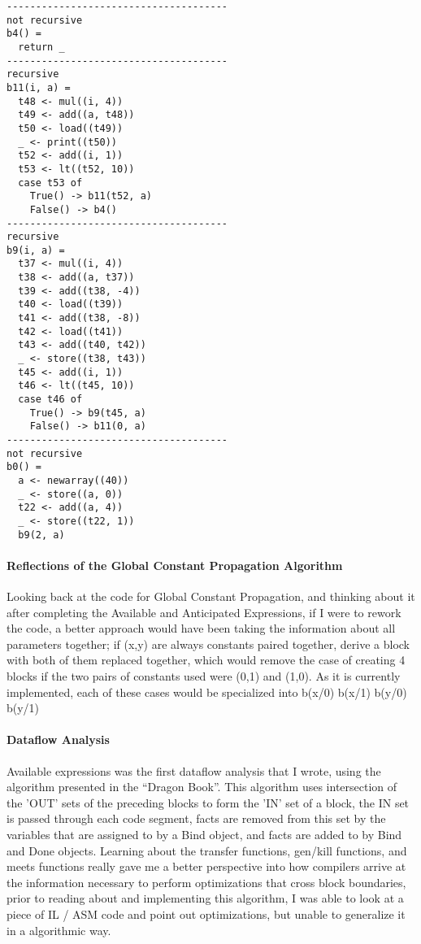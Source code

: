 \documentclass[14pt]{article}
\begin{document}
\begin{verbatim}
--------------------------------------
not recursive
b4() =
  return _
--------------------------------------
recursive
b11(i, a) =
  t48 <- mul((i, 4))
  t49 <- add((a, t48))
  t50 <- load((t49))
  _ <- print((t50))
  t52 <- add((i, 1))
  t53 <- lt((t52, 10))
  case t53 of
    True() -> b11(t52, a)
    False() -> b4()
--------------------------------------
recursive
b9(i, a) =
  t37 <- mul((i, 4))
  t38 <- add((a, t37))
  t39 <- add((t38, -4))
  t40 <- load((t39))
  t41 <- add((t38, -8))
  t42 <- load((t41))
  t43 <- add((t40, t42))
  _ <- store((t38, t43))
  t45 <- add((i, 1))
  t46 <- lt((t45, 10))
  case t46 of
    True() -> b9(t45, a)
    False() -> b11(0, a)
--------------------------------------
not recursive
b0() =
  a <- newarray((40))
  _ <- store((a, 0))
  t22 <- add((a, 4))
  _ <- store((t22, 1))
  b9(2, a)
\end{verbatim}
\paragraph{Reflections of the Global Constant Propagation Algorithm} Looking back at the code for Global Constant Propagation, and thinking about it after completing the Available and Anticipated Expressions, if I were to rework the code, a better approach would have been taking the information about all parameters together; if (x,y) are always constants paired together, derive a block with both of them replaced together, which would remove the case of creating 4 blocks if the two pairs of constants used were (0,1) and (1,0). As it is currently implemented, each of these cases would be specialized into b(x/0) b(x/1) b(y/0) b(y/1)
\paragraph{Dataflow Analysis}
Available expressions was the first dataflow analysis that I wrote, using the algorithm presented in the ``Dragon Book''. This algorithm uses intersection of the 'OUT' sets of the preceding blocks to form the 'IN' set of a block, the IN set is passed through each code segment, facts are removed from this set by the variables that are assigned to by a Bind object, and facts are added to by Bind and Done objects. Learning about the transfer functions, gen/kill functions, and meets functions really gave me a better perspective into how compilers arrive at the information necessary to perform optimizations that cross block boundaries, prior to reading about and implementing this algorithm, I was able to look at a piece of IL / ASM code and point out optimizations, but unable to generalize it in a algorithmic way.
\end{document}
